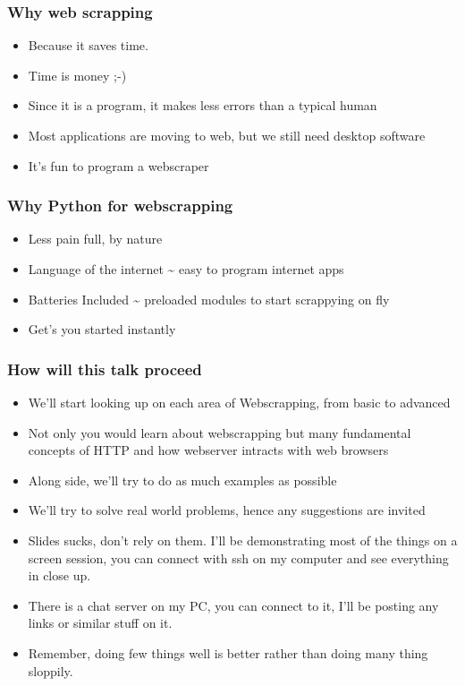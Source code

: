 \documentclass{beamer}
\begin{document}
\begin{frame}
\frametitle{Why web scrapping}
\label{sec-1_3}


\begin{itemize}
\item Because it saves time.
\item Time is money ;-)
\item Since it is a program, it makes less errors than a typical human
\item Most applications are moving to web, but we still need desktop software
\item It's fun to program a webscraper
\end{itemize}
\end{frame}
\begin{frame}
\frametitle{Why Python for webscrapping}
\label{sec-1_4}


\begin{itemize}
\item Less pain full, by nature
\item Language of the internet \~{} easy to program internet apps
\item Batteries Included \~{} preloaded modules to start scrappying on fly
\item Get's you started instantly
\end{itemize}
\end{frame}
\begin{frame}
\frametitle{How will this talk proceed}
\label{sec-1_5}


\begin{itemize}
\item We'll start looking up on each area of Webscrapping, from basic to advanced
\item Not only you would learn about webscrapping but many fundamental concepts of HTTP and how webserver intracts with web browsers
\item Along side, we'll try to do as much examples as possible
\item We'll try to solve real world problems, hence any suggestions are invited
\item Slides sucks, don't rely on them. I'll be demonstrating most of the things on a screen
     session, you can connect with ssh on my computer and see everything in close up.
\item There is a chat server on my PC, you can connect to it, I'll be posting any links or
     similar stuff on it.
\item Remember, doing few things well is better rather than doing many thing sloppily.
\end{itemize}
\end{frame}
\end{document}
